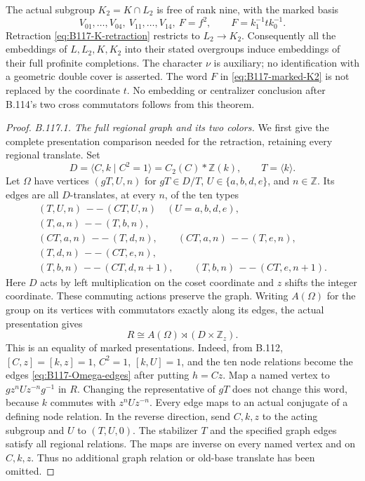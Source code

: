 The actual subgroup $K_2=K\cap L_2$ is free of rank nine, with
the marked basis
\begin{equation}\label{eq:B117-marked-K2}
 V_{01},\ldots,V_{04},\ V_{11},\ldots,V_{14},\ F=f^2,
 \qquad F=k_1^{-1}t k_0^{-1}.
\end{equation}
Retraction \eqref{eq:B117-K-retraction} restricts to $L_2\to K_2$.
Consequently all the embeddings of $L,L_2,K,K_2$ into their stated
overgroups induce embeddings of their full profinite completions.
The character $\nu$ is auxiliary; no identification with a geometric
double cover is asserted. The word $F$ in
\eqref{eq:B117-marked-K2} is not replaced by the coordinate $t$.
No embedding or centralizer conclusion after B.114's two cross
commutators follows from this theorem.

\begin{proof}
\emph{B.117.1. The full regional graph and its two colors.}
We first give the complete presentation comparison needed for the
retraction, retaining every regional translate. Set
\[
 D=\langle C,k\mid C^2=1\rangle=C_2(C)*\mathbb Z(k),
 \qquad T=\langle k\rangle.
\]
Let $\Omega$ have vertices $(gT,U,n)$ for $gT\in D/T$,
$U\in\{a,b,d,e\}$, and $n\in\mathbb Z$. Its edges are all
$D$-translates, at every $n$, of the ten types
\begin{equation}\label{eq:B117-Omega-edges}
 \begin{gathered}
 (T,U,n)\,--\,(CT,U,n)\quad(U=a,b,d,e),\\
 (T,a,n)\,--\,(T,b,n),\\
 (CT,a,n)\,--\,(T,d,n),\qquad
 (CT,a,n)\,--\,(T,e,n),\\
 (T,d,n)\,--\,(CT,e,n),\\
 (T,b,n)\,--\,(CT,d,n+1),\qquad
 (T,b,n)\,--\,(CT,e,n+1).
 \end{gathered}
\end{equation}
Here $D$ acts by left multiplication on the coset coordinate and
$z$ shifts the integer coordinate. These commuting actions preserve
the graph. Writing $A(\Omega)$ for the group on its vertices with
commutators exactly along its edges, the actual presentation gives
\begin{equation}\label{eq:B117-entire-regional-model}
 R\cong A(\Omega)\rtimes(D\times\mathbb Z_z).
\end{equation}
This is an equality of marked presentations. Indeed, from B.112,
$[C,z]=[k,z]=1$, $C^2=1$, $[k,U]=1$, and the ten node relations
become the edges \eqref{eq:B117-Omega-edges} after putting $h=Cz$.
Map a named vertex to $g z^n U z^{-n}g^{-1}$ in $R$.
Changing the representative of $gT$ does not change this word,
because $k$ commutes with $z^nUz^{-n}$. Every edge maps to an
actual conjugate of a defining node relation. In the reverse direction,
send $C,k,z$ to the acting subgroup and $U$ to $(T,U,0)$.
The stabilizer $T$ and the specified graph edges satisfy all regional
relations. The maps are inverse on every named vertex and on
$C,k,z$. Thus no additional graph relation or old-base translate
has been omitted.


\end{proof}
